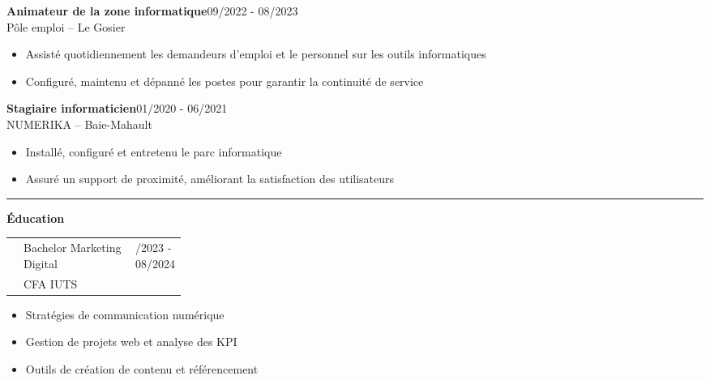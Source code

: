 \documentclass[a4paper]{article}
\renewcommand{\colorbox}[2]{#2}%
\newcommand{\fullrule}{\hspace{-1.5cm}\rule{\paperwidth}{0.4pt}}
\newcommand{\cvsection}[1]{%
  \vspace{6pt}\textbf{\Large #1}\par\vspace{2pt}}
\begin{document}
\vspace{3mm}

\colorbox{maincolor}{%
  \begin{minipage}{\linewidth}
    \noindent
    \textbf{Animateur de la zone informatique}\hfill 09/2022 - 08/2023\\
    Pôle emploi – Le Gosier\\[-0.3em]
    \begin{itemize}[leftmargin=*]
      \item Assisté quotidiennement les demandeurs d’emploi et le personnel sur les outils informatiques \item Configuré, maintenu et dépanné les postes pour garantir la continuité de service
    \end{itemize}
  \end{minipage}}

\vspace{3mm}

\colorbox{maincolor}{%
  \begin{minipage}{\linewidth}
    \noindent
    \textbf{Stagiaire informaticien}\hfill 01/2020 - 06/2021\\
    NUMERIKA – Baie-Mahault\\[-0.3em]
    \begin{itemize}[leftmargin=*]
      \item Installé, configuré et entretenu le parc informatique \item Assuré un support de proximité, améliorant la satisfaction des utilisateurs
    \end{itemize}
  \end{minipage}}

\medskip\fullrule

\cvsection{Éducation}
\hspace*{1.3cm}%

\begin{tabularx}{\linewidth}{@{}c  >{\RaggedRight\arraybackslash}X
                             >{\raggedleft\arraybackslash}p{0.25\linewidth}@{}}
\textcolor{sidetext}{} &
Bachelor Marketing Digital &
09/2023 - 08/2024 \\
& CFA IUTS & \\   %
\end{tabularx}
\begin{itemize}[leftmargin=*]
  \item Stratégies de communication numérique
  \item Gestion de projets web et analyse des KPI
  \item Outils de création de contenu et référencement
\end{itemize}
\vspace{3mm}
\end{document}
